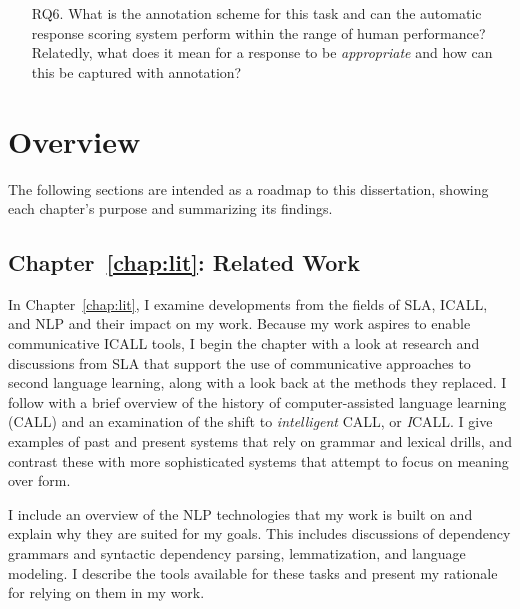 \begin{itemize}
\item[RQ6.]{What is the annotation scheme for this task and can the automatic response scoring system perform within the range of human performance? Relatedly, what does it mean for a response to be \textit{appropriate} and how can this be captured with annotation?}
\end{itemize}


\section{Overview}
\label{sec:overview}

The following sections are intended as a roadmap to this dissertation, showing each chapter's purpose and summarizing its findings.

\subsection{Chapter~\ref{chap:lit}: Related Work}

In Chapter~\ref{chap:lit}, I examine developments from the fields of SLA, ICALL, and NLP and their impact on my work. Because my work aspires to enable communicative ICALL tools, I begin the chapter with a look at research and discussions from SLA that support the use of communicative approaches to second language learning, along with a look back at the methods they replaced. I follow with a brief overview of the history of computer-assisted language learning (CALL) and an examination of the shift to \textit{intelligent} CALL, or \textit{I}CALL. I give examples of past and present systems that rely on grammar and lexical drills, and contrast these with more sophisticated systems that attempt to focus on meaning over form.

I include an overview of the NLP technologies that my work is built on and explain why they are suited for my goals. This includes discussions of dependency grammars and syntactic dependency parsing, lemmatization, and language modeling. I describe the tools available for these tasks and present my rationale for relying on them in my work.

